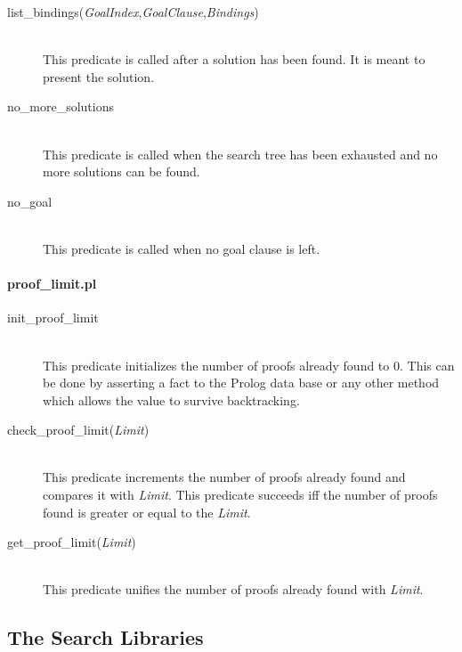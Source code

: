 \begin{description}
  \item [list\_bindings({\em GoalIndex},{\em GoalClause},{\em Bindings})]\ \\
    This predicate is called after a solution has been found. It is meant to
    present the solution.
  \item [no\_more\_solutions]\ \\
    This predicate is called when the search tree has been exhausted and no
    more solutions can be found.
  \item [no\_goal]\ \\
    This predicate is called when no goal clause is left.
\end{description}


\paragraph{proof\_limit.pl}\label{lib:proof_limit}

\begin{description}
  \item [init\_proof\_limit]\ \\
  This predicate initializes the number of proofs already found to 0. This can
  be done by asserting a fact to the Prolog data base or any other method
  which allows the value to survive backtracking.

  \item [check\_proof\_limit({\em Limit})]\ \\
  This predicate increments the number of proofs already found and compares it
  with {\em Limit}. This predicate succeeds iff the number of proofs found is
  greater or equal to the {\em Limit}.

  \item [get\_proof\_limit({\em Limit})]\ \\
  This predicate unifies the number of proofs already found with {\em Limit}.
\end{description}




\subsection{The Search Libraries}\label{lib:search}


